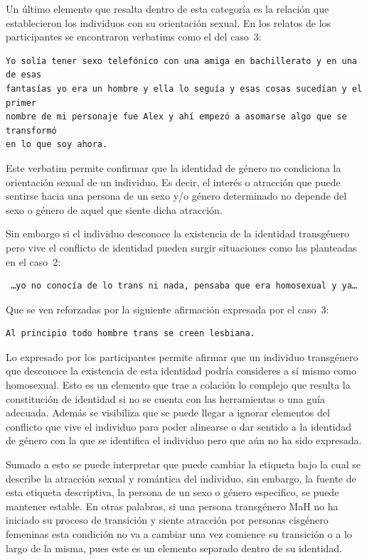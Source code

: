 Un último elemento que resalta dentro de esta categoría es la relación que
establecieron los individuos con su orientación sexual. En los relatos de los
participantes se encontraron verbatims como el del caso~3:

\begin{verbatim}
Yo solía tener sexo telefónico con una amiga en bachillerato y en una de esas
fantasías yo era un hombre y ella lo seguía y esas cosas sucedían y el primer
nombre de mi personaje fue Alex y ahí empezó a asomarse algo que se transformó
en lo que soy ahora.
\end{verbatim}

Este verbatim permite confirmar que la identidad de género no condiciona la
orientación sexual de un individuo. Es decir, el interés o atracción que puede
sentirse hacia una persona de un sexo y/o género determinado no depende del sexo
o género de aquel que siente dicha atracción.

Sin embargo si el individuo desconoce la existencia de la identidad transgénero
pero vive el conflicto de identidad pueden surgir situaciones como las
planteadas en el caso~2:

\begin{verbatim}
 …yo no conocía de lo trans ni nada, pensaba que era homosexual y ya…
\end{verbatim}

Que se ven reforzadas por la siguiente afirmación expresada por el caso~3:

\begin{verbatim}
Al principio todo hombre trans se creen lesbiana.
\end{verbatim}

Lo expresado por los participantes permite afirmar que un individuo transgénero
que desconoce la existencia de esta identidad podría consideres a sí mismo como
homosexual. Esto es un elemento que trae a colación lo complejo que resulta la
constitución de identidad si no se cuenta con las herramientas o una guía
adecuada. Además se visibiliza que se puede llegar a ignorar elementos del
conflicto que vive el individuo para poder alinearse o dar sentido a la
identidad de género con la que se identifica el individuo pero que aún no ha
sido expresada.

Sumado a esto se puede interpretar que puede cambiar la etiqueta bajo la cual se
describe la atracción sexual y romántica del individuo, sin embargo, la fuente
de esta etiqueta descriptiva, la persona de un sexo o género especifico, se
puede mantener estable. En otras palabras, si una persona transgénero MaH no ha
iniciado su proceso de transición y siente atracción por personas cisgénero
femeninas esta condición no va a cambiar una vez comience su transición o
a lo largo de la misma, pues este es un elemento separado dentro de su
identidad.

